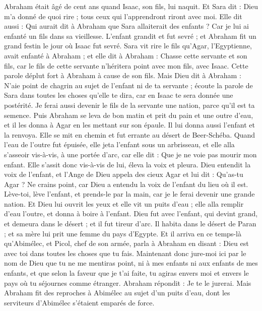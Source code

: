 \begin{multicols}{2}
Abraham était âgé de cent ans quand Isaac, son fils, lui naquit.
Et Sara dit : Dieu m'a donné de quoi rire ; tous ceux qui l'apprendront riront avec moi.
Elle dit aussi : Qui aurait dit à Abraham que Sara allaiterait des enfants ? Car je lui ai enfanté un fils dans sa vieillesse.
L'enfant grandit et fut sevré ; et Abraham fit un grand festin le jour où Isaac fut sevré.
Sara vit rire le fils qu’Agar, l’Egyptienne, avait enfanté à Abraham ;
et elle dit à Abraham : Chasse cette servante et son fils, car le fils de cette servante n'héritera point avec mon fils, avec Isaac.
Cette parole déplut fort à Abraham à cause de son fils.
Mais Dieu dit à Abraham : N'aie point de chagrin au sujet de l'enfant ni de ta servante ;  écoute la parole de Sara dans toutes les choses qu’elle te dira, car en Isaac te sera donnée une postérité.
Je ferai aussi devenir le fils de la servante une nation, parce qu'il est ta semence.
Puis Abraham se leva de bon matin et prit du pain et une outre d'eau, et il les donna à Agar en les mettant sur son épaule. Il lui donna aussi l'enfant et la renvoya. Elle se mit en chemin et fut errante au désert de Beer-Schéba.
Quand l'eau de l’outre fut épuisée, elle jeta l'enfant sous un arbrisseau,
et elle alla s’asseoir vis-à-vis, à une portée d’arc, car elle dit : Que je ne voie pas mourir mon enfant. Elle s’assit donc vis-à-vis de lui, éleva la voix et pleura.
Dieu entendit la voix de l'enfant, et l'Ange de Dieu appela des cieux Agar et lui dit : Qu'as-tu Agar ? Ne crains point, car Dieu a entendu la voix de l'enfant du lieu où il est.
Lève-toi, lève l'enfant, et prends-le par la main, car je le ferai devenir une grande nation.
Et Dieu lui ouvrit les yeux et elle vit un puits d'eau ; elle alla remplir d'eau l’outre, et donna à boire à l'enfant.
Dieu fut avec l'enfant, qui devint grand, et demeura dans le désert ; et il fut tireur d'arc.
Il habita dans le désert de Paran ; et sa mère lui prit une femme du pays d'Egypte.
Et il arriva en ce temps-là qu'Abimélec, et Picol, chef de son armée, parla à Abraham en disant : Dieu est avec toi dans toutes les choses que tu fais.
Maintenant donc jure-moi ici par le nom de Dieu que tu ne me mentiras point, ni à mes enfants ni aux enfants de mes enfants, et que selon la faveur que je t'ai faite, tu agiras envers moi et envers le pays où tu séjournes comme étranger.
Abraham répondit : Je te le jurerai.
Mais Abraham fit des reproches à Abimélec au sujet d'un puits d'eau, dont les serviteurs d'Abimélec s'étaient emparés de force.

\end{multicols}
